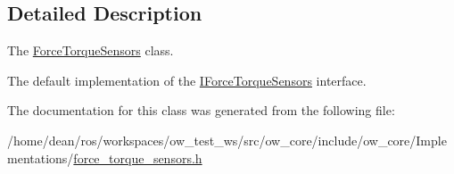 \subsection{Detailed Description}
The \hyperlink{classow__core_1_1ForceTorqueSensors}{Force\+Torque\+Sensors} class. 

The default implementation of the \hyperlink{classow__core_1_1IForceTorqueSensors}{I\+Force\+Torque\+Sensors} interface. 

The documentation for this class was generated from the following file\+:\begin{DoxyCompactItemize}
\item 
/home/dean/ros/workspaces/ow\+\_\+test\+\_\+ws/src/ow\+\_\+core/include/ow\+\_\+core/\+Implementations/\hyperlink{force__torque__sensors_8h}{force\+\_\+torque\+\_\+sensors.\+h}\end{DoxyCompactItemize}
